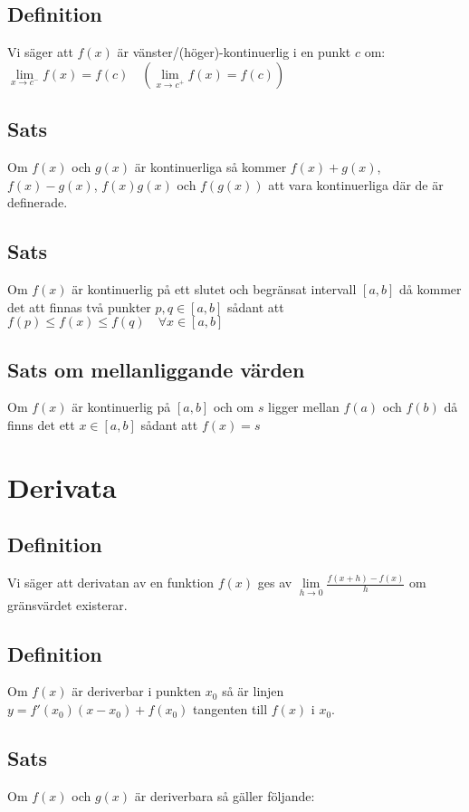 \documentclass{article}
\begin{document}
\subsection{Definition}
Vi säger att $f(x)$ är vänster/(höger)-kontinuerlig i en punkt $c$ om: $\lim\limits_{x\to c^{-}} f(x)=f(c) \quad (\lim\limits_{x\to c^{+}} f(x)=f(c))$

\subsection{Sats}
Om $f(x)$ och $g(x)$ är kontinuerliga så kommer $f(x)+g(x)$, $f(x)-g(x)$, $f(x)g(x)$ och $f(g(x))$ att vara kontinuerliga där de är definerade.

\subsection{Sats}
Om $f(x)$ är kontinuerlig på ett slutet och begränsat intervall  $[a,b]$ då kommer det att finnas två punkter $p,q\in [a,b]$ sådant att $f(p)\leq f(x)\leq f(q) \quad \forall x\in [a,b]$

\subsection{Sats om mellanliggande värden}
Om $f(x)$ är kontinuerlig på $[a,b]$ och om $s$ ligger mellan $f(a)$ och $f(b)$ då finns det ett $x\in [a,b]$ sådant att $f(x)=s$

\section{Derivata}
\subsection{Definition}
Vi säger att derivatan av en funktion $f(x)$ ges av $\lim\limits_{h\to  0}\frac{f(x+h)-f(x)}{h}$ om gränsvärdet existerar.

\subsection{Definition}
Om $f(x)$ är deriverbar i punkten $x_{0}$ så är linjen $y=f'(x_{0})(x-x_{0})+f(x_{0})$ tangenten till $f(x)$ i $x_{0}$.

\subsection{Sats}
Om $f(x)$ och $g(x)$ är deriverbara så gäller följande:
\end{document}

